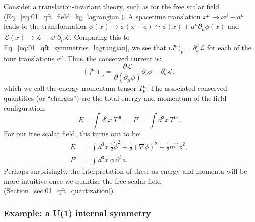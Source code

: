Consider a translation-invariant theory, such as for the free scalar field (Eq.~\ref{eq:01_qft_field_kg_lagrangian}).
A spacetime translation $x^\mu \rightarrow x^\mu - a^\mu$ leads to the transformation $\phi(x) \rightarrow \phi(x + a) \simeq \phi(x) + a^\mu \partial_\mu \phi(x)$ and $\mathcal L(x) \rightarrow \mathcal L + a^\mu \partial_\mu \mathcal L$.
Comparing this to Eq.~\ref{eq:01_qft_symmetries_lagrangian}, we see that $\mathcal (J^\mu)_\nu = \delta^\mu_\nu \mathcal L$ for each of the four translations $a^\nu$.
Thus, the conserved current is:
\begin{equation}
	\label{eq:01_qft_symmetries_current_translation}
	(j^\mu)_\nu = \frac{\partial\mathcal L}{\partial(\partial_\mu\phi)}\partial_\nu\phi - \delta^\mu_\nu \mathcal L,
\end{equation}
which we call the energy-momentum tensor $T^{\mu}_\nu$.
The associated conserved quantities (or ``charges'') are the total energy and momentum of the field configuration:
\begin{equation}
    \label{eq:01_qft_symmetries_charge_translation}
    E = \int d^3x\ T^{00}, \quad P^i = \int d^3x\ T^{0i}.
\end{equation}
For our free scalar field, this turns out to be:
\begin{equation}
    \label{eq:01_qft_symmetries_charge_translation_kg}
    \begin{split}
        E &= \int d^3x\ \frac{1}{2}\dot\phi^2 + \frac{1}{2}(\nabla\phi)^2 + \frac{1}{2}m^2\phi^2, \\
        P^i &= \int d^3x\ \dot\phi\,\partial^i\phi.
    \end{split}
\end{equation}
Perhaps surprisingly, the interpretation of these as energy and momenta will be more intuitive once we quantize the free scalar field (Section~\ref{sec:01_qft_quantization}).


\subsubsection{Example: a U(1) internal symmetry}

